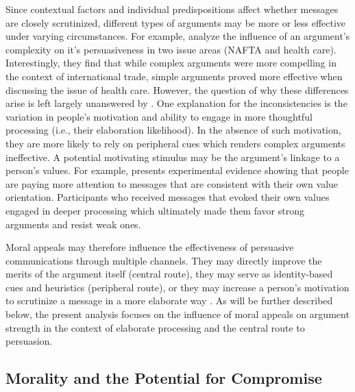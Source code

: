 Since contextual factors and individual predispositions affect whether messages are closely scrutinized, different types of arguments may be more or less effective under varying circumstances. For example, \citet{cobb1997changing} analyze the influence of an argument's complexity on it's persuasiveness in two issue areas (NAFTA and health care). Interestingly, they find that while complex arguments were more compelling in the context of international trade, simple arguments proved more effective when discussing the issue of health care. However, the question of why these differences arise is left largely unanswered by \citet{cobb1997changing}. One explanation for the inconsistencies is the variation in people's motivation and ability to engage in more thoughtful processing (i.e., their elaboration likelihood). In the absence of such motivation, they are more likely to rely on peripheral cues which renders complex arguments ineffective. A potential motivating stimulus may be the argument's linkage to a person's values. For example, \citet{nelson2005values} presents experimental evidence showing that people are paying more attention to messages that are consistent with their own value orientation. Participants who received messages that evoked their own values engaged in deeper processing which ultimately made them favor strong arguments and resist weak ones.

Moral appeals may therefore influence the effectiveness of persuasive communications through multiple channels. They may directly improve the merits of the argument itself (central route), they may serve as identity-based cues and heuristics (peripheral route), or they may increase a person's motivation to scrutinize a message in a more elaborate way \citep[see also][]{petty1986elaboration}. As will be further described below, the present analysis focuses on the influence of moral appeals on argument strength in the context of elaborate processing and the central route to persuasion.



\subsection{Morality and the Potential for Compromise}



